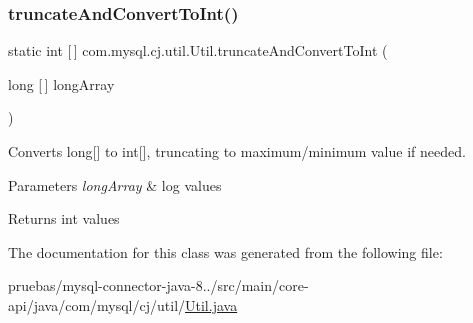 \subsubsection{\texorpdfstring{truncate\+And\+Convert\+To\+Int()}{truncateAndConvertToInt()}\hspace{0.1cm}{\footnotesize\ttfamily [2/2]}}
{\footnotesize\ttfamily static int \mbox{[}$\,$\mbox{]} com.\+mysql.\+cj.\+util.\+Util.\+truncate\+And\+Convert\+To\+Int (\begin{DoxyParamCaption}\item[{long \mbox{[}$\,$\mbox{]}}]{long\+Array }\end{DoxyParamCaption})\hspace{0.3cm}{\ttfamily [static]}}

Converts long\mbox{[}\mbox{]} to int\mbox{[}\mbox{]}, truncating to maximum/minimum value if needed.


\begin{DoxyParams}{Parameters}
{\em long\+Array} & log values \\
\hline
\end{DoxyParams}
\begin{DoxyReturn}{Returns}
int values 
\end{DoxyReturn}


The documentation for this class was generated from the following file\+:\begin{DoxyCompactItemize}
\item 
pruebas/mysql-\/connector-\/java-\/8../src/main/core-\/api/java/com/mysql/cj/util/\mbox{\hyperlink{_util_8java}{Util.\+java}}\end{DoxyCompactItemize}
